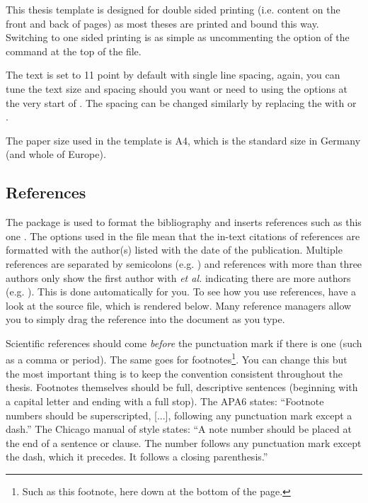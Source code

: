 This thesis template is designed for double sided printing (i.e. content on the front and back of pages) as most theses are printed and bound this way. Switching to one sided printing is as simple as uncommenting the  option of the  command at the top of the  file.

The text is set to 11 point by default with single line spacing, again, you can tune the text size and spacing should you want or need to using the options at the very start of . The spacing can be changed similarly by replacing the  with  or .

The paper size used in the template is A4, which is the standard size in Germany (and whole of Europe).

\subsection{References}

The  package is used to format the bibliography and inserts references such as this one \parencite{Reference1}. The options used in the  file mean that the in-text citations of references are formatted with the author(s) listed with the date of the publication. Multiple references are separated by semicolons (e.g. \parencite{Reference2, Reference1}) and references with more than three authors only show the first author with \emph{et al.} indicating there are more authors (e.g. \parencite{Reference3}). This is done automatically for you. To see how you use references, have a look at the  source file, which is rendered below. Many reference managers allow you to simply drag the reference into the document as you type.

Scientific references should come \emph{before} the punctuation mark if there is one (such as a comma or period). The same goes for footnotes\footnote{Such as this footnote, here down at the bottom of the page.}. You can change this but the most important thing is to keep the convention consistent throughout the thesis. Footnotes themselves should be full, descriptive sentences (beginning with a capital letter and ending with a full stop). The APA6 states: \enquote{Footnote numbers should be superscripted, [...], following any punctuation mark except a dash.} The Chicago manual of style states: \enquote{A note number should be placed at the end of a sentence or clause. The number follows any punctuation mark except the dash, which it precedes. It follows a closing parenthesis.}

